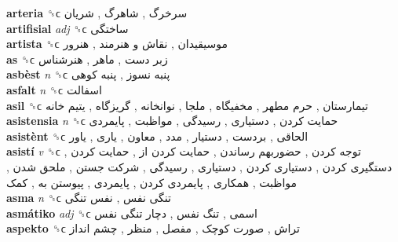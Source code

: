 \textbf{arteria} ␝ϲ   سرخرگ ,  شاهرگ ,  شریان   \\
\textbf{artifisial} \emph{adj}  ␝ϲ   ساختگی   \\
\textbf{artista} ␝ϲ   موسیقیدان ,  نقاش و هنرمند ,  هنرور   \\
\textbf{as} ␝ϲ   زبر دست ,  ماهر ,  هنرشناس   \\
\textbf{asbèst} \emph{n}  ␝ϲ   پنبه نسوز ,  پنبه کوهی   \\
\textbf{asfalt} \emph{n}  ␝ϲ   اسفالت   \\
\textbf{asil} ␝ϲ   تیمارستان ,  حرم مطهر ,  مخفیگاه ,  ملجا ,  نوانخانه ,  گریزگاه ,  یتیم خانه   \\
\textbf{asistensia} \emph{n}  ␝ϲ   حمایت کردن ,  دستیاری ,  رسیدگی ,  مواظبت ,  پایمردی   \\
\textbf{asistènt} ␝ϲ   الحاقی ,  بردست ,  دستیار ,  مدد ,  معاون ,  یاری ,  یاور   \\
\textbf{asistí} \emph{v}  ␝ϲ   توجه کردن ,  حضوربهم رساندن ,  حمایت کردن از ,  حمایت کردن ,  دستگیری کردن ,  دستیاری کردن ,  دستیاری ,  رسیدگی ,  شرکت جستن ,  ملحق شدن ,  مواظبت ,  همکاری ,  پایمردی کردن ,  پایمردی ,  پیوستن به ,  کمک   \\
\textbf{asma} \emph{n}  ␝ϲ   تنگی نفس ,  نفس تنگی   \\
\textbf{asmátiko} \emph{adj}  ␝ϲ   اسمی ,  تنگ نفس ,  دچار تنگی نفس   \\
\textbf{aspekto} ␝ϲ   تراش ,  صورت کوچک ,  مفصل ,  منظر ,  چشم انداز   \\
